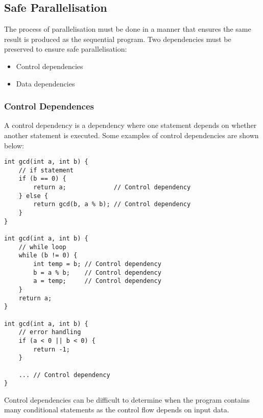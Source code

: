 \documentclass{article}
\begin{document}
\subsection{Safe Parallelisation}
The process of parallelisation must be done in a manner that ensures
the same result is produced as the sequential program. Two dependencies
must be preserved to ensure safe parallelisation:
\begin{itemize}
    \item Control dependencies
    \item Data dependencies
\end{itemize}
\subsubsection{Control Dependences}
A control dependency is a dependency where one statement depends on
whether another statement is executed. Some examples of control
dependencies are shown below:
\begin{verbatim}
int gcd(int a, int b) {
    // if statement
    if (b == 0) {
        return a;             // Control dependency
    } else {
        return gcd(b, a % b); // Control dependency
    }
}

int gcd(int a, int b) {
    // while loop
    while (b != 0) {
        int temp = b; // Control dependency
        b = a % b;    // Control dependency
        a = temp;     // Control dependency
    }
    return a;
}

int gcd(int a, int b) {
    // error handling
    if (a < 0 || b < 0) {
        return -1;
    }

    ... // Control dependency
}
\end{verbatim}
Control dependencies can be difficult to determine when the program
contains many conditional statements as the control flow depends on
input data.
\end{document}
